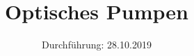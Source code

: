 
\usepackage{pgfplotstable}
\subject{V21}
\title{Optisches Pumpen}
\date{%
  Durchführung: 28.10.2019
}



\maketitle
\thispagestyle{empty}
\tableofcontents
\newpage




\newpage

\printbibliography{}



